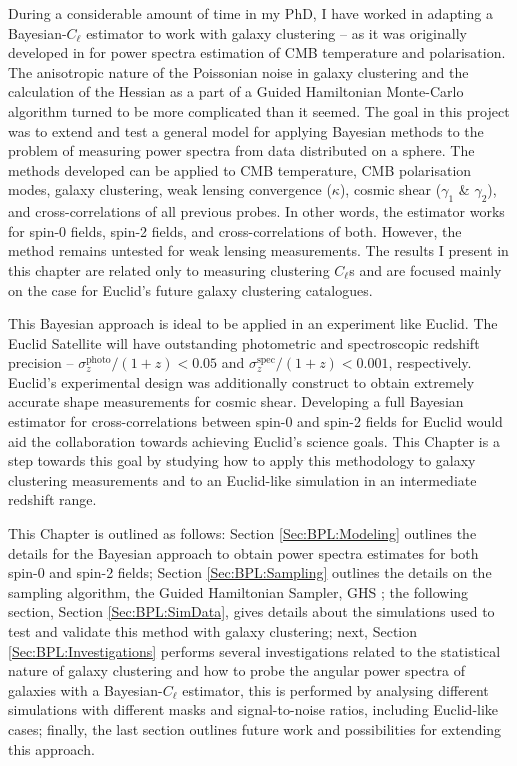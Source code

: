 \qquad During a considerable amount of time in my PhD, I have worked in adapting a Bayesian-$C_{\ell}$ estimator to work with galaxy clustering -- as it was originally developed in \cite{SreeThesis} for power spectra estimation of CMB temperature and polarisation. The anisotropic nature of the Poissonian noise in galaxy clustering and the calculation of the Hessian as a part of a Guided Hamiltonian Monte-Carlo algorithm \citep{2013-GuidedHamiltonian} turned to be more complicated than it seemed. The goal in this project was to extend and test a general model for applying Bayesian methods to the problem of measuring power spectra from data distributed on a sphere. The methods developed can be applied to CMB temperature, CMB polarisation modes, galaxy clustering, weak lensing convergence ($\kappa$), cosmic shear ($\gamma_1$ \& $\gamma_2$), and cross-correlations of all previous probes. In other words, the estimator works for spin-0 fields, spin-2 fields, and cross-correlations of both. However, the method remains untested for weak lensing measurements. The results I present in this chapter are related only to measuring clustering $C_{\ell}$s and are focused mainly on the case for Euclid's future galaxy clustering catalogues.

\qquad This Bayesian approach is ideal to be applied in an experiment like Euclid. The Euclid Satellite will have outstanding photometric and spectroscopic redshift precision -- $\sigma^{\text{photo}}_z/(1+z) < 0.05$ and  $\sigma^{\text{spec}}_z/(1+z)< 0.001$, respectively. Euclid's experimental design was additionally construct to obtain extremely accurate shape measurements for cosmic shear. Developing a full Bayesian estimator for cross-correlations between spin-0 and spin-2 fields for Euclid would aid the collaboration towards achieving Euclid's science goals. This Chapter is a step towards this goal by studying how to apply this methodology to galaxy clustering measurements and to an Euclid-like simulation in an intermediate redshift range.

\qquad This Chapter is outlined as follows: Section \ref{Sec:BPL:Modeling} outlines the details for the Bayesian approach to obtain power spectra estimates for both spin-0 and spin-2 fields; Section \ref{Sec:BPL:Sampling} outlines the details on the sampling algorithm, the Guided Hamiltonian Sampler, GHS \citep{SreeThesis,2013-GuidedHamiltonian}; the following section, Section \ref{Sec:BPL:SimData}, gives details about the simulations used to test and validate this method with galaxy clustering; next, Section \ref{Sec:BPL:Investigations} performs several investigations related to the statistical nature of galaxy clustering and how to probe the angular power spectra of galaxies with a Bayesian-$C_{\ell}$ estimator, this is performed by analysing different simulations with different masks and signal-to-noise ratios, including Euclid-like cases; finally, the last section outlines future work and possibilities for extending this approach. 

